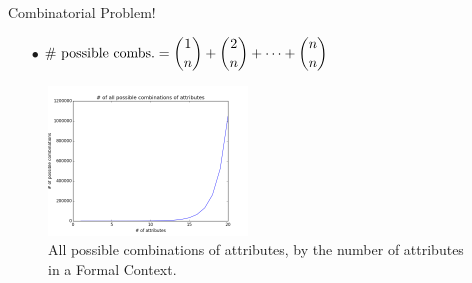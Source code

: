 \documentclass[pdf,xcolor=table]{beamer}
\begin{document}
\begin{frame}[t]{Combinatorial Problem!}
    \begin{itemize}
        \item[$\bullet$] $\# \text{ possible combs.} = \dbinom{1}{n} + \dbinom{2}{n} + \cdots + \dbinom{n}{n}$
    \end{itemize}
    \begin{figure}
        \centering
        \includegraphics[width=150pt]{all_possible_combinations.png}
        \caption{All possible combinations of attributes, by the number of attributes in a Formal Context.}
    \end{figure}
\end{frame}
\end{document}
